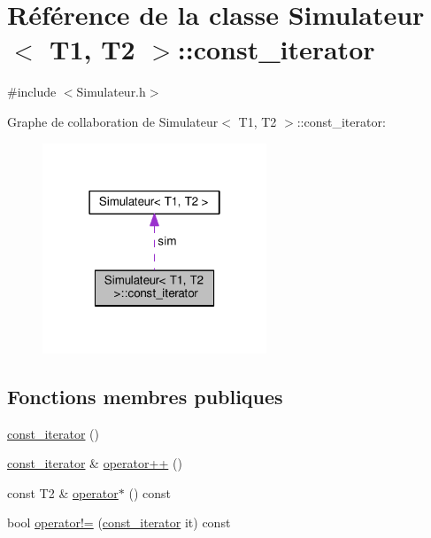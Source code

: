\hypertarget{class_simulateur_1_1const__iterator}{}\section{Référence de la classe Simulateur$<$ T1, T2 $>$\+:\+:const\+\_\+iterator}
\label{class_simulateur_1_1const__iterator}


{\ttfamily \#include $<$Simulateur.\+h$>$}



Graphe de collaboration de Simulateur$<$ T1, T2 $>$\+:\+:const\+\_\+iterator\+:\nopagebreak
\begin{figure}[H]
\begin{center}
\leavevmode
\includegraphics[width=190pt]{class_simulateur_1_1const__iterator__coll__graph}
\end{center}
\end{figure}
\subsection*{Fonctions membres publiques}
\begin{DoxyCompactItemize}
\item 
\hyperlink{class_simulateur_1_1const__iterator_adefd901a2eed44f15f00771cca1c940d}{const\+\_\+iterator} ()
\item 
\hyperlink{class_simulateur_1_1const__iterator}{const\+\_\+iterator} \& \hyperlink{class_simulateur_1_1const__iterator_ab5d1bea2f07780e6ae8d11a0accbfc87}{operator++} ()
\item 
const T2 \& \hyperlink{class_simulateur_1_1const__iterator_a4bc17b0d2decb5fb010155447f313c37}{operator$\ast$} () const 
\item 
bool \hyperlink{class_simulateur_1_1const__iterator_a1892ab7977db8b778365d94436652414}{operator!=} (\hyperlink{class_simulateur_1_1const__iterator}{const\+\_\+iterator} it) const 
\end{DoxyCompactItemize}
